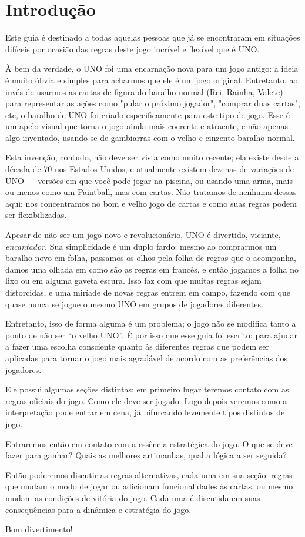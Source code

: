 \section*{Introdução}

Este guia é destinado a todas aquelas pessoas que já se encontraram em situações difíceis por ocasião das regras deste jogo incrível e flexível que é UNO.

À bem da verdade, o UNO foi uma encarnação nova para um jogo antigo: a ideia é muito óbvia e simples para acharmos que ele é um jogo original. Entretanto, ao invés de usarmos as cartas de figura do baralho normal (Rei, Rainha, Valete) para representar as ações como "pular o próximo jogador", "comprar duas cartas", etc, o baralho de UNO foi criado especificamente para este tipo de jogo. Esse é um apelo visual que torna o jogo ainda mais coerente e atraente, e não apenas algo inventado, usando-se de gambiarras com o velho e cinzento baralho normal.

Esta invenção, contudo, não deve ser vista como muito recente; ela existe desde a década de 70 nos Estados Unidos, e atualmente existem dezenas de variações de UNO --- versões em que você pode jogar na piscina, ou usando uma arma, mais ou menos como um Paintball, mas com cartas. Não tratamos de nenhuma dessas aqui: nos concentramos no bom e velho jogo de cartas e como suas regras podem ser flexibilizadas.

Apesar de não ser um jogo novo e revolucionário, UNO é divertido, viciante, \textit{encantador}. Sua simplicidade é um duplo fardo: mesmo ao comprarmos um baralho novo em folha, passamos os olhos pela folha de regras que o acompanha, damos uma olhada em como são as regras em francês, e então jogamos a folha no lixo ou em alguma gaveta escura. Isso faz com que muitas regras sejam distorcidas, e uma miríade de novas regras entrem em campo, fazendo com que quase nunca se jogue o mesmo UNO em grupos de jogadores diferentes.

Entretanto, isso de forma alguma é um problema; o jogo não se modifica tanto a ponto de não ser ``o velho UNO''. É por isso que esse guia foi escrito: para ajudar a fazer uma escolha consciente quanto às diferentes regras que podem ser aplicadas para tornar o jogo mais agradável de acordo com as preferências dos jogadores.

Ele possui algumas seções distintas: em primeiro lugar teremos contato com as regras oficiais do jogo. Como ele deve ser jogado. Logo depois veremos como a interpretação pode entrar em cena, já bifurcando levemente tipos distintos de jogo.

Entraremos então em contato com a essência estratégica do jogo. O que se deve fazer para ganhar? Quais as melhores artimanhas, qual a lógica a ser seguida?

Então poderemos discutir as regras alternativas, cada uma em sua seção: regras que mudam o modo de jogar ou adicionam funcionalidades às cartas, ou mesmo mudam as condições de vitória do jogo. Cada uma é discutida em suas consequências para a dinâmica e estratégia do jogo.

Bom divertimento!